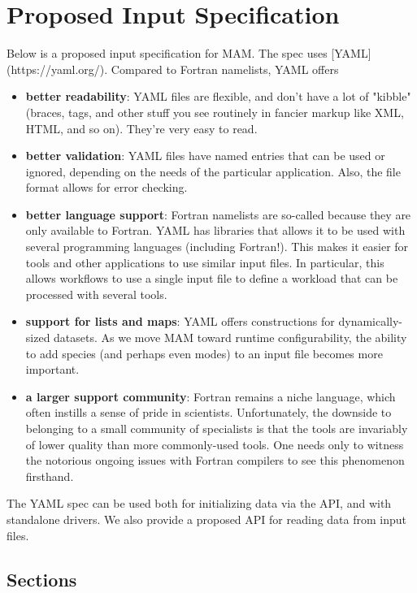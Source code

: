 \section{Proposed Input Specification}

Below is a proposed input specification for MAM. The spec uses
[YAML](https://yaml.org/). Compared to Fortran namelists, YAML offers

\begin{itemize}
  \item {\bf better readability}: YAML files are flexible, and don't have a lot
    of "kibble" (braces, tags, and other stuff you see routinely in fancier
    markup like XML, HTML, and so on). They're very easy to read.
  \item {\bf better validation}: YAML files have named entries that can be
    used or ignored, depending on the needs of the particular application.
    Also, the file format allows for error checking.
  \item {\bf better language support}: Fortran namelists are so-called because
    they are only available to Fortran. YAML has libraries that allows it to
    be used with several programming languages (including Fortran!). This makes
    it easier for tools and other applications to use similar input files. In
    particular, this allows workflows to use a single input file to define a
    workload that can be processed with several tools.
  \item {\bf support for lists and maps}: YAML offers constructions for
    dynamically-sized datasets. As we move MAM toward runtime configurability,
    the ability to add species (and perhaps even modes) to an input file
    becomes more important.
  \item {\bf a larger support community}: Fortran remains a niche language,
    which often instills a sense of pride in scientists. Unfortunately, the
    downside to belonging to a small community of specialists is that the tools
    are invariably of lower quality than more commonly-used tools. One needs
    only to witness the notorious ongoing issues with Fortran compilers to see
    this phenomenon firsthand.
\end{itemize}

The YAML spec can be used both for initializing data via the API, and with
standalone drivers. We also provide a proposed API for reading data from
input files.

\subsection*{Sections}


